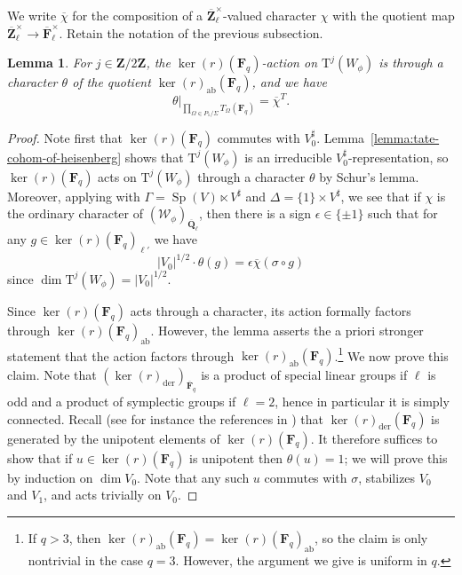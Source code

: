 \documentclass[reqno]{amsart}
\numberwithin{equation}{subsection}
\newcommand{\F}{\mathbf{F}}
\newcommand{\Q}{\mathbf{Q}}
\newcommand{\Z}{\mathbf{Z}}
\newcommand{\ol}[1]{\overline{#1}}
\newcommand\cW{\mathcal{W}}
\DeclareMathOperator{\ab}{ab}
\DeclareMathOperator{\Sp}{Sp}
\DeclareMathOperator{\der}{der}
\newcommand{\rT}{\ensuremath{\mathrm{T}}\xspace}
\newtheorem{lemma}[thm]{Lemma}
\theoremstyle{remark}
\numberwithin{equation}{subsection}
\numberwithin{figure}{subsection}
\begin{document}
We write $\ol \chi$ for the composition of a $\ol \Z_\ell^\times$-valued character $\chi$ with the quotient map $\ol\Z_\ell^\times \to \ol \F_\ell^\times$. Retain the notation of the previous subsection.

\begin{lemma}\label{lemma:weil-rep-character-non-sp}
For $j \in \Z/2\Z$, the $\ker(r)(\F_q)$-action on $\rT^j(W_\phi)$ is through a character $\theta$ of the quotient $\ker(r)_{\ab}(\F_q)$, and we have
\begin{equation}\label{eqn:ker-r-character-restriction}
\theta|_{\prod_{\Omega \in P_1/\Sigma} T_\Omega(\F_q)} = \ol \chi^T.
\end{equation}
\end{lemma}

\begin{proof}
Note first that $\ker(r)(\F_q)$ commutes with $V_0^\sharp$. Lemma~\ref{lemma:tate-cohom-of-heisenberg} shows that $\rT^j(W_\phi)$ is an irreducible $V_0^\sharp$-representation, so $\ker(r)(\F_q)$ acts on $\rT^j(W_\phi)$ through a character $\theta$ by Schur's lemma. Moreover, applying \cite[Theorem~3.5.4]{Cot26b} with $\Gamma = \Sp(V) \ltimes V^\sharp$ and $\Delta = \{1\} \times V^\sharp$, we see that if $\chi$ is the ordinary character of $(\cW_\phi)_{\ol\Q_\ell}$, then there is a sign $\epsilon \in \{\pm 1\}$ such that for any $g \in \ker(r)(\F_q)_{\ell'}$ we have
\begin{equation}\label{eqn:ker-r-character-rel}
|V_0|^{1/2}\cdot\theta(g) = \epsilon\ol\chi(\sigma \circ g)
\end{equation}
since $\dim \rT^j(W_\phi) = |V_0|^{1/2}$.

Since $\ker(r)(\F_q)$ acts through a character, its action formally factors through $\ker(r)(\F_q)_{\ab}$. However, the lemma asserts the a priori stronger statement that the action factors through $\ker(r)_{\ab}(\F_q)$.\footnote{If $q > 3$, then $\ker(r)_{\ab}(\F_q) = \ker(r)(\F_q)_{\ab}$, so the claim is only nontrivial in the case $q = 3$. However, the argument we give is uniform in $q$.} We now prove this claim. Note that $(\ker(r)_{\der})_{\ol\F_q}$ is a product of special linear groups if $\ell$ is odd and a product of symplectic groups if $\ell=2$, hence in particular it is simply connected. Recall (see for instance the references in \cite[Theorem C.1, Proposition C.3]{FS25}) that $\ker(r)_{\der}(\F_q)$ is generated by the unipotent elements of $\ker(r)(\F_q)$. It therefore suffices to show that if $u \in \ker(r)(\F_q)$ is unipotent then $\theta(u) = 1$; we will prove this by induction on $\dim V_0$. Note that any such $u$ commutes with $\sigma$, stabilizes $V_0$ and $V_1$, and acts trivially on $V_0$.


\end{proof}
\end{document}
